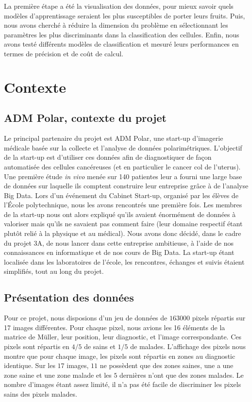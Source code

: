 \documentclass[a4paper,10pt]{report}
\begin{document}
La première étape a été la visualisation des données, pour mieux savoir quels modèles d'apprentissage seraient les plus susceptibles de porter leurs fruits. Puis, nous avons cherché à réduire la dimension du problème en sélectionnant les paramètres les plus discriminants dans la classification des cellules. Enfin, nous avons testé différents modèles de classification et mesuré leurs performances en termes de précision et de coût de calcul.
\chapter{Contexte}

\vspace*{-12pt} %

\section{ADM Polar, contexte du projet}
Le principal partenaire du projet est ADM Polar, une start-up d'imagerie médicale basée sur la collecte et l'analyse de données polarimétriques. L'objectif de la start-up est d'utiliser ces données afin de diagnostiquer de façon automatisée des cellules cancéreuses (et en particulier le cancer col de l'uterus). Une première étude \emph{in vivo} menée sur 140 patientes leur a fourni une large base de données sur laquelle ils comptent construire leur entreprise grâce à de l'analyse Big Data. Lors d'un événement du Cabinet Start-up, organisé par les élèves de l'École polytechnique, nous les avons rencontrés une première fois. Les membres de la start-up nous ont alors expliqué qu'ils avaient énormément de données à valoriser mais qu'ils ne savaient pas comment faire (leur domaine respectif étant plutôt relié à la physique et au médical). Nous avons donc décidé, dans le cadre du projet 3A, de nous lancer dans cette entreprise ambitieuse, à l'aide de nos connaissances en informatique et de nos cours de Big Data. La start-up étant localisée dans les laboratoires de l'école, les rencontres, échanges et suivis étaient simplifiés, tout au long du projet.
\section{Présentation des données}
Pour ce projet, nous disposions d'un jeu de données de $163 000$ pixels répartis sur 17 images différentes. Pour chaque pixel, nous avions les 16 éléments de la matrice de Müller, leur position, leur diagnostic, et l'image correspondante.
Ces pixels sont répartis en $4/5$ de sains et $1/5$ de malades. L'affichage des pixels nous montre que pour chaque image, les pixels sont répartis en zones au diagnostic identique. Sur les $17$ images, $11$ ne possèdent que des zones saines, une a une zone saine et une zone malade et les $5$ dernières n’ont que des zones malades. Le nombre d'images étant assez limité, il n'a pas été facile de discriminer les pixels sains des pixels malades.
\end{document}
